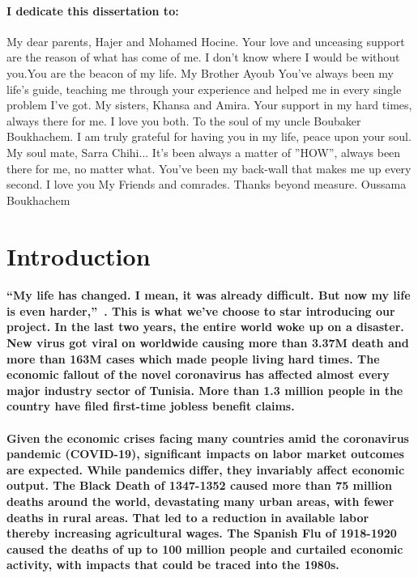 \documentclass[12pt]{report}
\begin{document}
\paragraph{\normalfont I dedicate this dissertation to:\newline}
My dear parents, Hajer and Mohamed Hocine.
Your love and unceasing support are the reason of what has come of me. I don’t know where I
would be without you.You are the beacon of my life.
My Brother Ayoub
You’ve always been my life's guide, teaching me through your experience and helped me in every single problem I’ve got.
My sisters, Khansa and Amira.
Your support in my hard times, always there for me. I love you both.
To the soul of my uncle Boubaker Boukhachem.
I am truly grateful for having you in my life, peace upon your soul.
My soul mate, Sarra Chihi...
It's been always a matter of ''HOW'', always been there for me, no matter what. You've been my back-wall that makes me up every second. I love you
My Friends and comrades.
Thanks beyond measure. {\tiny Oussama Boukhachem}

\pagebreak






\tableofcontents

\pagebreak

\listoffigures
\pagebreak
\listoftables
\pagebreak

\section{Introduction}

\paragraph{\normalfont “My life has changed. I mean, it was already difficult. But now my life is even harder,”~\cite{one}. This is what we’ve choose to star introducing our project. In the last two years, the entire world woke up on a disaster. New virus got viral on worldwide causing more than 3.37M death and more than 163M cases which made people living hard times. The economic fallout of the novel coronavirus has affected almost every major industry sector of Tunisia. More than 1.3 million people in the country have filed first-time jobless benefit claims.}
\paragraph{\normalfont Given the economic crises facing many countries amid the coronavirus pandemic (COVID-19), significant impacts on labor market outcomes are expected. While pandemics differ, they invariably affect economic output. The Black Death of 1347-1352 caused more than 75 million deaths around the world, devastating many urban areas, with fewer deaths in rural areas. That led to a reduction in available labor thereby increasing agricultural wages. The Spanish Flu of 1918-1920 caused the deaths of up to 100 million people and curtailed economic activity, with impacts that could be traced into the 1980s.}
\end{document}
